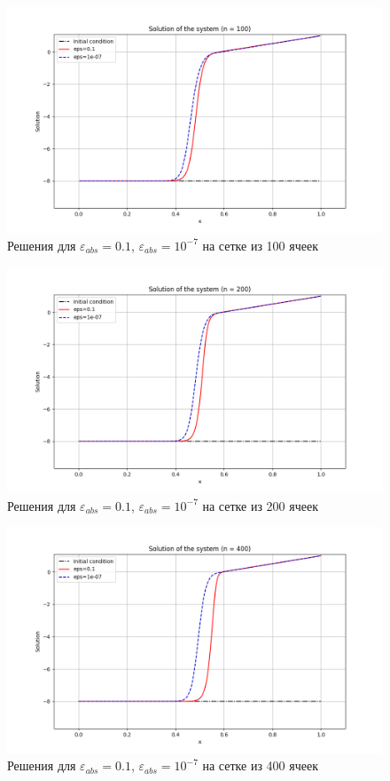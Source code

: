 \documentclass[a4paper,12pt]{article}
\begin{document}
\begin{figure}[ht] \centering
	\includegraphics[width=\textwidth]{n100}
	\caption{Решения для $\varepsilon_{abs} = 0.1$, $\varepsilon_{abs} = 10^{-7}$ на сетке из 100 ячеек\label{pic:n100}}
\end{figure}

\begin{figure}[ht] \centering
\includegraphics[width=\textwidth]{n200}
\caption{Решения для $\varepsilon_{abs} = 0.1$, $\varepsilon_{abs} = 10^{-7}$ на сетке из 200 ячеек\label{pic:n200}}
\end{figure}

\begin{figure}[ht] \centering
	\includegraphics[width=\textwidth]{n400}
	\caption{Решения для $\varepsilon_{abs} = 0.1$, $\varepsilon_{abs} = 10^{-7}$ на сетке из 400 ячеек\label{pic:n400}}
\end{figure}
\end{document}
